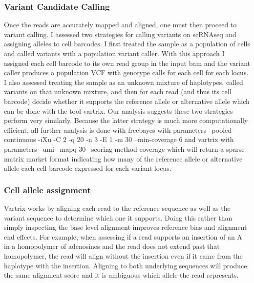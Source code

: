 \subsubsection{Variant Candidate Calling}
\par{
Once the reads are accurately mapped and aligned, one must then proceed to variant calling. I assessed two strategies for calling variants on scRNAseq and assigning alleles to cell barcodes. I first treated 
the sample as a population of cells and called variants with a population variant caller\cite{freebayes}\cite{gatk}\cite{samtools}. With this approach I assigned each cell barcode to its own read group in the input bam and the variant caller produces a population VCF with genotype calls for each cell for each locus.
I also assessed treating the sample as an unknown mixture of haplotypes, called variants on that unknown mixture, and then for each read (and thus its cell barcode) decide whether it supports the reference allele or alternative allele which can be done with the tool vartrix\cite{vartrix}. Our analysis suggests these two strategies perform very similarly. Because the latter strategy is much more computationally efficient, all further analysis is done with freebayes with parameters --pooled-continuous -iXu -C 2 -q 20 -n 3 -E 1 -m 30 --min-coverage 6 and vartrix with parameters  --umi --mapq 30 --scoring-method coverage which will return a sparse matrix market format indicating how many of the reference allele or alternative allele each cell barcode expressed for each variant locus.
}
\subsubsection{Cell allele assignment}
\par{
 Vartrix works by aligning each read to the reference sequence as well as the variant sequence to determine which one it supports. Doing this rather than simply inspecting the base level alignment improves reference bias and alignment end effects. For example, when assessing if a read supports an insertion of an A in a homopolymer of adenosines and the read does not extend past that homopolymer, the read will align without the insertion even if it came from the haplotype with the insertion. Aligning to both underlying sequences will produce the same alignment score and it is ambiguous which allele the read represents.
}
